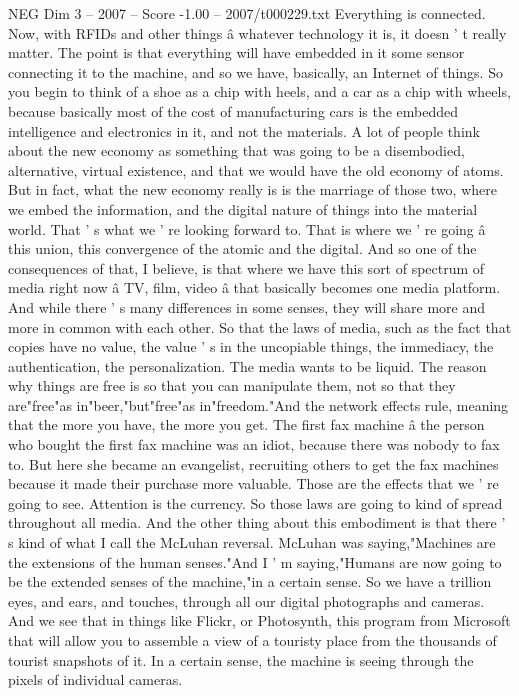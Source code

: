 \begin{textsample}{NEG Dim 3 – 2007 – Score -1.00 – 2007/t000229.txt}
Everything is connected.
Now, with RFIDs and other things â whatever technology it is, it doesn ' t really matter.
The point is that everything will have embedded in it some sensor connecting it to the machine, and so we have, basically, an Internet of things.
So you begin to think of a shoe as a chip with heels, and a car as a chip with wheels, because basically most of the cost of manufacturing cars is the embedded intelligence and electronics in it, and not the materials.
A lot of people think about the new economy as something that was going to be a disembodied, alternative, virtual existence, and that we would have the old economy of atoms.
But in fact, what the new economy really is is the marriage of those two, where we embed the information, and the digital nature of things into the material world.
That ' s what we ' re looking forward to.
That is where we ' re going â this union, this convergence of the atomic and the digital.
And so one of the consequences of that, I believe, is that where we have this sort of spectrum of media right now â TV, film, video â that basically becomes one media platform.
And while there ' s many differences in some senses, they will share more and more in common with each other.
So that the laws of media, such as the fact that copies have no value, the value ' s in the uncopiable things, the immediacy, the authentication, the personalization.
The media wants to be liquid.
The reason why things are free is so that you can manipulate them, not so that they are"free"as in"beer,"but"free"as in"freedom."And the network effects rule, meaning that the more you have, the more you get.
The first fax machine â the person who bought the first fax machine was an idiot, because there was nobody to fax to.
But here she became an evangelist, recruiting others to get the fax machines because it made their purchase more valuable.
Those are the effects that we ' re going to see.
Attention is the currency.
So those laws are going to kind of spread throughout all media.
And the other thing about this embodiment is that there ' s kind of what I call the McLuhan reversal.
McLuhan was saying,"Machines are the extensions of the human senses."And I ' m saying,"Humans are now going to be the extended senses of the machine,"in a certain sense.
So we have a trillion eyes, and ears, and touches, through all our digital photographs and cameras.
And we see that in things like Flickr, or Photosynth, this program from Microsoft that will allow you to assemble a view of a touristy place from the thousands of tourist snapshots of it.
In a certain sense, the machine is seeing through the pixels of individual cameras.

\end{textsample}
